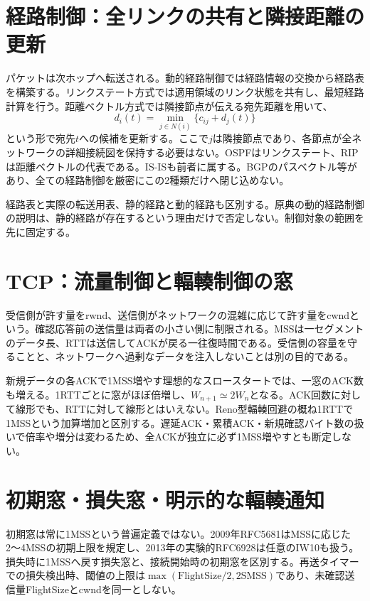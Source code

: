 \section{経路制御：全リンクの共有と隣接距離の更新}
\label{theory:network:routing}
パケットは次ホップへ転送される。動的経路制御では経路情報の交換から経路表を構築する。リンクステート方式では適用領域のリンク状態を共有し、最短経路計算を行う。距離ベクトル方式では隣接節点が伝える宛先距離を用いて、
\[
 d_i(t)=\min_{j\in N(i)}\{c_{ij}+d_j(t)\}
\]
という形で宛先$t$への候補を更新する。ここで$j$は隣接節点であり、各節点が全ネットワークの詳細接続図を保持する必要はない。OSPFはリンクステート、RIPは距離ベクトルの代表である\cite{net_ospf,net_rip}。IS-ISも前者に属する。BGPのパスベクトル等があり、全ての経路制御を厳密にこの2種類だけへ閉じ込めない。

経路表と実際の転送用表、静的経路と動的経路も区別する。原典の動的経路制御の説明は、静的経路が存在するという理由だけで否定しない。制御対象の範囲を先に固定する。

\section{TCP：流量制御と輻輳制御の窓}
\label{theory:network:tcp}
受信側が許す量をrwnd、送信側がネットワークの混雑に応じて許す量をcwndという。確認応答前の送信量は両者の小さい側に制限される。MSSは一セグメントのデータ長、RTTは送信してACKが戻る一往復時間である。受信側の容量を守ることと、ネットワークへ過剰なデータを注入しないことは別の目的である\cite{net_tcp2009}。

新規データの各ACKで1MSS増やす理想的なスロースタートでは、一窓のACK数も増える。1RTTごとに窓がほぼ倍増し、$W_{n+1}\simeq2W_n$となる。ACK回数に対して線形でも、RTTに対して線形とはいえない。Reno型輻輳回避の概ね1RTTで1MSSという加算増加と区別する。遅延ACK・累積ACK・新規確認バイト数の扱いで倍率や増分は変わるため、全ACKが独立に必ず1MSS増やすとも断定しない。

\section{初期窓・損失窓・明示的な輻輳通知}
\label{theory:network:ecn}
初期窓は常に1MSSという普遍定義ではない。2009年RFC5681はMSSに応じた2〜4MSSの初期上限を規定し、2013年の実験的RFC6928は任意のIW10も扱う。損失時に1MSSへ戻す損失窓と、接続開始時の初期窓を区別する\cite{net_tcp2009,net_iw2013}。再送タイマーでの損失検出時、閾値の上限は$\max(\mathrm{FlightSize}/2,2\mathrm{SMSS})$であり、未確認送信量FlightSizeとcwndを同一としない。

